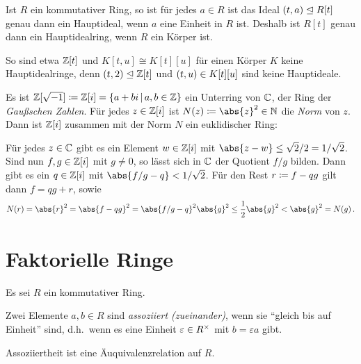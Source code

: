 \begin{remark}
  Ist $R$ ein kommutativer Ring, so ist für jedes $a \in R$ ist das Ideal $(t, a) \mathrel{\trianglelefteq} R[t]$ genau dann ein Hauptideal, wenn $a$ eine Einheit in $R$ ist.
  Deshalb ist $R[t]$ genau dann ein Hauptidealring, wenn $R$ ein Körper ist.
  
  So sind etwa $\mathbb{Z}[t]$ und $K[t,u] \cong K[t][u]$ für einen Körper $K$ keine Hauptidealringe, denn $(t, 2) \mathrel{\trianglelefteq} \mathbb{Z}[t]$ und $(t, u) \in K[t][u]$ sind keine Hauptideale.
\end{remark}

\begin{example}
  Es ist $\Integer[\sqrt{-1}] \defined \Integer[i] = \{a + bi \suchthat a, b \in \Integer\}$ ein Unterring von $\mathbb{C}$, der Ring der \emph{Gaußschen Zahlen}.
  Für jedes $z \in \mathbb{Z}[i]$ ist $N(z) \defined \abs{z}^2 \in \Natural$ die \emph{Norm} von $z$.
  Dann ist $\mathbb{Z}[i]$ zusammen mit der Norm $N$ ein euklidischer Ring:
  
  Für jedes $z \in \mathbb{C}$ gibt es ein Element $w \in \mathbb{Z}[i]$ mit $\abs{z-w} \leq \sqrt{2}/2 = 1/\sqrt{2}$.
  Sind nun $f, g \in \mathbb{Z}[i]$ mit $g \neq 0$, so lässt sich in $\mathbb{C}$ der Quotient $f/g$ bilden.
  Dann gibt es ein $q \in \mathbb{Z}[i]$ mit $\abs{f/g - q} < 1/\sqrt{2}$.
  Für den Rest $r \coloneqq f - qg$ gilt dann $f = qg + r$, sowie
  \[
          N(r)
    =     \abs{r}^2
    =     \abs{f - qg}^2
    =     \abs{f/g - q}^2 \abs{g}^2
    \leq  \frac{1}{2} \abs{g}^2
    <     \abs{g}^2
    =     N(g) \,.
  \]
\end{example}





\section{Faktorielle Ringe}

Es sei $R$ ein kommutativer Ring.

\begin{definition}
  Zwei Elemente $a, b \in R$ sind \emph{assoziiert \textup(zueinander\textup)}, wenn sie \enquote{gleich bis auf Einheit} sind, d.h.\ wenn es eine Einheit $\varepsilon \in R^{\times}$ mit $b = \varepsilon a$ gibt.
\end{definition}

\begin{lemma}
  Assoziiertheit ist eine Äuquivalenzrelation auf $R$.
\end{lemma}

